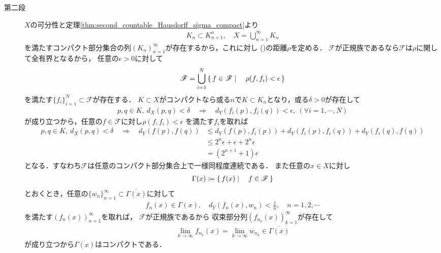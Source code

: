\begin{prf}
\begin{description}
			\item[第二段]
				$X$の可分性と定理\ref{thm:second_countable_Hausdorff_sigma_compact}より
				\begin{align}
					K_n \subset K_{n+1}^{\mathrm{o}},
					\quad X = \bigcup_{n=1}^\infty K_n
				\end{align}
				を満たすコンパクト部分集合の列$(K_n)_{n=1}^\infty$が存在するから，これに対し
				()の距離$\rho$を定める．
				$\mathscr{F}$が正規族であるなら$\mathscr{F}$は$\rho$に関して全有界となるから，
				任意の$\epsilon > 0$に対して
				\begin{align}
					\mathscr{F}
					= \bigcup_{i=1}^N \left\{\, f \in \mathscr{F} \mid \quad \rho(f,f_i) < \epsilon\, \right\}
				\end{align}
				を満たす$\{f_i\}_{i=1}^N \subset \mathscr{F}$が存在する．
				$K \subset X$がコンパクトなら或る$n$で$K \subset K_n$となり，或る$\delta > 0$が存在して
				\begin{align}
					p,q \in K,\ d_X(p,q) < \delta
					\quad \Longrightarrow \quad
					d_Y(f_i(p),f_i(q)) < \epsilon,\ (\forall i = 1,\cdots,N)
				\end{align}
				が成り立つから，任意の$f \in \mathscr{F}$に対し$\rho(f,f_i) < \epsilon$
				を満たす$f_i$を取れば
				\begin{align}
					p,q \in K,\ d_X(p,q) < \delta
					\quad \Longrightarrow \quad
					d_Y(f(p),f(q)) 
					&\leq d_Y(f(p),f_i(p)) + d_Y(f_i(p),f_i(q)) + d_Y(f_i(q),f(q)) \\
					&\leq 2^n \epsilon + \epsilon + 2^n \epsilon \\
					&= (2^{n+1} + 1)\epsilon
				\end{align}
				となる．すなわち$\mathscr{F}$は任意のコンパクト部分集合上で一様同程度連続である．
				また任意の$x \in X$に対し
				\begin{align}
					\Gamma(x) \coloneqq \left\{\, f(x) \mid \quad f \in \mathscr{F}\, \right\}
				\end{align}
				とおくとき，任意の$\{w_n\}_{n=1}^\infty \subset \overline{\Gamma(x)}$に対して
				\begin{align}
					f_n(x) \in \Gamma(x),
					\quad d_Y(f_n(x),w_n) < \frac{1}{n}, \quad n=1,2,\cdots
				\end{align}
				を満たす$\left(f_n(x)\right)_{n=1}^\infty$を取れば，
				$\mathscr{F}$が正規族であるから
				収束部分列$\left(f_{n_k}(x)\right)_{k=1}^\infty$が存在して
				\begin{align}
					\lim_{k \to \infty} f_{n_k}(x)
					= \lim_{k \to \infty} w_{n_k}
					\in \overline{\Gamma(x)}
				\end{align}
				が成り立つから$\overline{\Gamma(x)}$はコンパクトである．
				\QED
		\end{description}
	\end{prf}